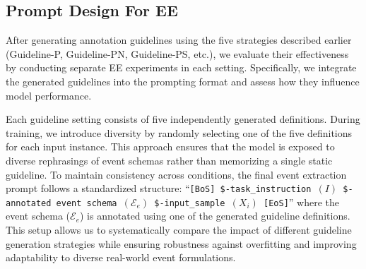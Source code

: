 \subsection{Prompt Design For EE}
After generating annotation guidelines using the five strategies described earlier (Guideline-P, Guideline-PN, Guideline-PS, etc.), we evaluate their effectiveness by conducting separate EE experiments in each setting. Specifically, we integrate the generated guidelines into the prompting format and assess how they influence model performance.

Each guideline setting consists of five independently generated definitions. During training, we introduce diversity by randomly selecting one of the five definitions for each input instance. This approach ensures that the model is exposed to diverse rephrasings of event schemas rather than memorizing a single static guideline. To maintain consistency across conditions, the final event extraction prompt follows a standardized structure: ``\texttt{[BoS] \$-task\_instruction $(I)$ \$-annotated event schema $(\mathcal{E}_e)$~\$-input\_sample~$(X_i)$~[EoS]}'' where the event schema ($\mathcal{E}_e$) is annotated using one of the generated guideline definitions. This setup allows us to systematically compare the impact of different guideline generation strategies while ensuring robustness against overfitting and improving adaptability to diverse real-world event formulations.





